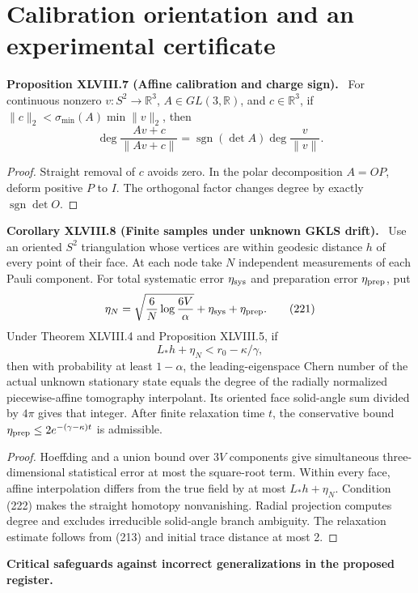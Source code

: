 \documentclass[11pt,a4paper,oneside]{book}
\newcommand{\R}{\mathbb R}\newcommand{\C}{\mathbb C}\newcommand{\Z}{\mathbb Z}\newcommand{\N}{\mathbb N}\newcommand{\Q}{\mathbb Q}
\newcommand{\statement}[3]{\par\medskip\noindent\textbf{#1 #2 (#3).}\ }
\newcommand{\note}[1]{\par\medskip\noindent\textbf{#1}\ }
\begin{document}
\section{Calibration orientation and an experimental certificate}
\statement{Proposition}{XLVIII.7}{Affine calibration and charge sign}
For continuous nonzero $v:S^2\to\R^3$, $A\in GL(3,\R)$, and $c\in\R^3$, if $\|c\|_2<\sigma_{\min}(A)\min\|v\|_2$, then
\begin{equation}\deg\frac{Av+c}{\|Av+c\|}=\operatorname{sgn}(\det A)\deg\frac v{\|v\|}.\tag{220}\end{equation}
\begin{proof}
Straight removal of $c$ avoids zero. In the polar decomposition $A=OP$, deform positive $P$ to $I$. The orthogonal factor changes degree by exactly $\operatorname{sgn}\det O$.
\end{proof}
\statement{Corollary}{XLVIII.8}{Finite samples under unknown GKLS drift}
Use an oriented $S^2$ triangulation whose vertices are within geodesic distance $h$ of every point of their face. At each node take $N$ independent measurements of each Pauli component. For total systematic error $\eta_{\rm sys}$ and preparation error $\eta_{\rm prep}$, put
\begin{equation}\eta_N=\sqrt{\frac6N\log\frac{6V}\alpha}+\eta_{\rm sys}+\eta_{\rm prep}.\tag{221}\end{equation}
Under Theorem XLVIII.4 and Proposition XLVIII.5, if
\begin{equation}L_*h+\eta_N<r_0-\kappa/\gamma,\tag{222}\end{equation}
then with probability at least $1-\alpha$, the leading-eigenspace Chern number of the actual unknown stationary state equals the degree of the radially normalized piecewise-affine tomography interpolant. Its oriented face solid-angle sum divided by $4\pi$ gives that integer. After finite relaxation time $t$, the conservative bound $\eta_{\rm prep}\le2e^{-(\gamma-\kappa)t}$ is admissible.
\begin{proof}
Hoeffding and a union bound over $3V$ components give simultaneous three-dimensional statistical error at most the square-root term. Within every face, affine interpolation differs from the true field by at most $L_*h+\eta_N$. Condition (222) makes the straight homotopy nonvanishing. Radial projection computes degree and excludes irreducible solid-angle branch ambiguity. The relaxation estimate follows from (213) and initial trace distance at most 2.
\end{proof}
\note{Critical safeguards against incorrect generalizations in the proposed register.}
\end{document}
